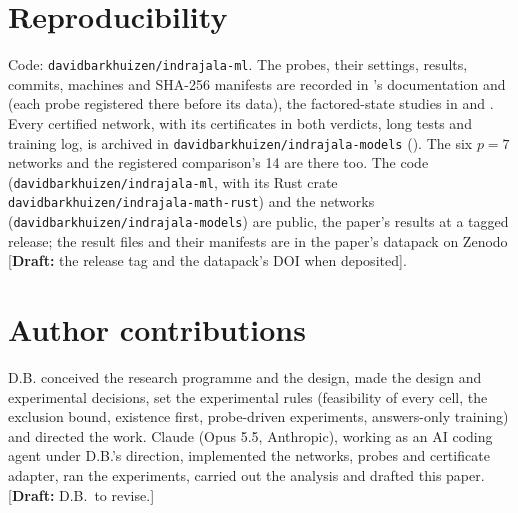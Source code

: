 \documentclass[11pt]{article}
\newcommand{\draftnote}[1]{\textcolor{red!70!black}{[\textbf{Draft:} #1]}}
\begin{document}
\section{Reproducibility}

Code: \texttt{davidbarkhuizen/indrajala-ml}. The probes, their settings, results, commits, machines
and SHA-256 manifests are recorded in 's documentation and
 (each probe registered there before its data), the factored-state
studies in  and .
Every certified network, with its certificates in both verdicts, long tests and training log, is
archived in \texttt{davidbarkhuizen/indrajala-models} ().
The six $p = 7$ networks and the registered comparison's 14 are there too.
The code (\texttt{davidbarkhuizen/indrajala-ml}, with its Rust crate
\texttt{davidbarkhuizen/indrajala-math-rust}) and the networks
(\texttt{davidbarkhuizen/indrajala-models}) are public, the paper's results at a tagged release;
the result files and their manifests are in the paper's datapack on Zenodo \draftnote{the release
tag and the datapack's DOI when deposited}.

\section*{Author contributions}
D.B. conceived the research programme and the design, made the design and experimental decisions,
set the experimental rules (feasibility of every cell, the exclusion bound, existence first,
probe-driven experiments, answers-only training) and directed the work. Claude (Opus 5.5,
Anthropic), working as an AI coding agent under D.B.'s direction, implemented the networks, probes
and certificate adapter, ran the experiments, carried out the analysis and drafted this paper.
\draftnote{D.B.\ to revise.}



\end{document}
